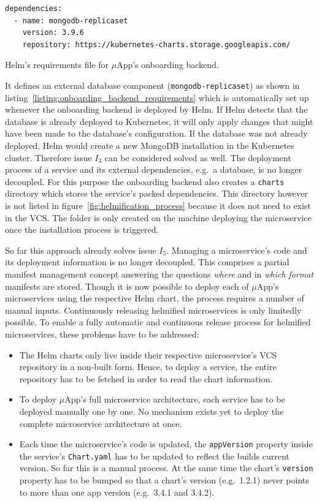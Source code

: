 \begin{listing}[H]
  \begin{verbatim}
dependencies:
  - name: mongodb-replicaset
    version: 3.9.6
    repository: https://kubernetes-charts.storage.googleapis.com/
  \end{verbatim}
  \caption{Helm's requirements file for $\mu$App's onboarding backend.}%
  \label{listing:onboarding_backend_requirements}
\end{listing}

It defines an external database component (\texttt{mongodb-replicaset}) as
shown in listing~\ref{listing:onboarding_backend_requirements} which is
automatically set up whenever the onboarding backend is deployed by Helm. If
Helm detects that the database is already deployed to Kubernetes, it will only
apply changes that might have been made to the database's configuration. If the
database was not already deployed, Helm would create a new MongoDB installation
in the Kubernetes cluster. Therefore issue $I_3$ can be considered solved as
well. The deployment process of a service and its external dependencies, e.g.\
a database, is no longer decoupled.  For this purpose the onboarding backend
also creates a \texttt{charts} directory which stores the service's packed
dependencies. This directory however is not listed in
figure~\ref{fig:helmification_process} because it does not need to exist in the
\ac{VCS}. The folder is only created on the machine deploying the microservice
once the installation process is triggered.

So far this approach already solves issue $I_5$. Managing a microservice's code
and its deployment information is no longer decoupled. This comprises a partial
manifest management concept answering the questions \textit{where} and in
\textit{which format} manifests are stored. Though it is now possible to deploy
each of $\mu$App's microservices using the respective Helm chart, the process
requires a number of manual inputs. Continuously releasing helmified
microservices is only limitedly possible. To enable a fully automatic and
continuous release process for helmified microservices, these problems have to
be addressed:

\begin{itemize}
  \item The Helm charts only live inside their respective microservice's
    \ac{VCS} repository in a non-built form. Hence, to deploy a service, the
    entire repository has to be fetched in order to read the chart information.
  \item To deploy $\mu$App's full microservice architecture, each service has
    to be deployed manually one by one. No mechanism exists yet to deploy the
    complete microservice architecture at once.
  \item Each time the microservice's code is updated, the \texttt{appVersion}
    property inside the service's \texttt{Chart.yaml} has to be updated to
    reflect the builds current version. So far this is a manual process. At the
    same time the chart's \texttt{version} property has to be bumped so that a
    chart's version (e.g.\ 1.2.1) never points to more than one app version
    (e.g.\ 3.4.1 and 3.4.2).
\end{itemize}

